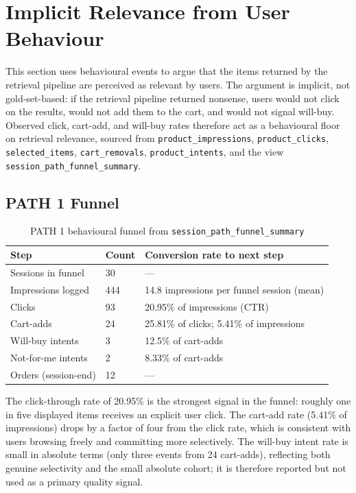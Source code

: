 \section{Implicit Relevance from User Behaviour}
\label{sec:implicit_relevance}

This section uses behavioural events to argue that the items returned by the retrieval pipeline are perceived as relevant by users. The argument is implicit, not gold-set-based: if the retrieval pipeline returned nonsense, users would not click on the results, would not add them to the cart, and would not signal will-buy. Observed click, cart-add, and will-buy rates therefore act as a behavioural floor on retrieval relevance, sourced from \texttt{product\_impressions}, \texttt{product\_clicks}, \texttt{selected\_items}, \texttt{cart\_removals}, \texttt{product\_intents}, and the view \texttt{session\_path\_funnel\_summary}.

\subsection{PATH 1 Funnel}
\label{subsec:path1_funnel}

\begin{table}[H]
\centering
\begin{tabular}{p{3.5cm}p{2cm}p{4.5cm}}
\toprule
\textbf{Step} & \textbf{Count} & \textbf{Conversion rate to next step}\\
\midrule
Sessions in funnel  & 30 & ---\\
Impressions logged   & 444 & 14.8 impressions per funnel session (mean)\\
Clicks               & 93 & 20.95\% of impressions (CTR)\\
Cart-adds            & 24 & 25.81\% of clicks; 5.41\% of impressions\\
Will-buy intents     & 3 & 12.5\% of cart-adds\\
Not-for-me intents   & 2 & 8.33\% of cart-adds\\
Orders (session-end) & 12 & ---\\
\bottomrule
\end{tabular}
\caption{PATH 1 behavioural funnel from \texttt{session\_path\_funnel\_summary}}
\label{tab:path1_funnel}
\end{table}

The click-through rate of 20.95\% is the strongest signal in the funnel: roughly one in five displayed items receives an explicit user click. The cart-add rate (5.41\% of impressions) drops by a factor of four from the click rate, which is consistent with users browsing freely and committing more selectively. The will-buy intent rate is small in absolute terms (only three events from 24 cart-adds), reflecting both genuine selectivity and the small absolute cohort; it is therefore reported but not used as a primary quality signal.

